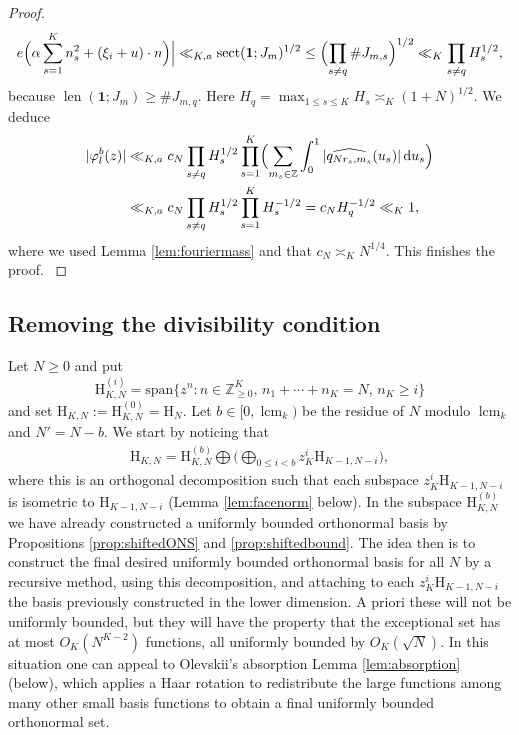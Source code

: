 \documentclass[a4paper,reqno,12pt]{amsart}
\theoremstyle{plain}
\theoremstyle{plain}
\theoremstyle{remark}
\theoremstyle{plain}
\newcommand{\PolySpace}{\mathrm{H}}
\renewcommand{\H}{\mathrm{H}}
\newcommand{\ft}{\widehat}
\newcommand{\al}{\alpha}
\newcommand{\dd}{\mathrm{d}}
\newcommand{\p}{\varphi}
\newcommand{\Z}{\mathbb{Z}}
\newcommand{\lcmk}{\operatorname{lcm}_k}
\newcommand{\len}{\operatorname{len}}
\newcommand{\sect}{\operatorname{sect}}
\theoremstyle{plain}
\theoremstyle{plain}
\begin{document}
{\begin{proof}
{\begin{align}
e\Bigl(\al\sum_{s=1}^Kn_s^2+(\xi_i+u)\cdot n\Bigr)\Bigr|
\ll_{K,a}\sect(\mathbf1;J_m)^{1/2}
\leq\Bigl(\prod_{s\ne q}\#J_{m,s}\Bigr)^{1/2}
\ll_K\prod_{s\ne q}H_s^{1/2},
\label{eq:sectionalVolumeOfTile}
\end{align}
because $\len(\mathbf1;J_m)\geq\#J_{m,q}$. Here $H_q=\max_{1\leq s\leq K} H_s \asymp_K (1+N)^{1/2}$. 
We deduce
\begin{align*}
|\p^b_{l}(z)|
&\ll_{K,a}c_N\prod_{s\ne q}H_s^{1/2}
\prod_{s=1}^K\Bigl(\sum_{m_s\in\Z}\int_0^1
|\ft{q_{Nr_s,m_s}}(u_s)|\,\dd u_s\Bigr)\\
&\ll_{K,a}c_N\prod_{s\ne q}H_s^{1/2}\prod_{s=1}^KH_s^{-1/2}
=c_NH_q^{-1/2}\ll_K1,
\end{align*}
where we used Lemma \ref{lem:fouriermass} and that $c_N \asymp_K {N^{1/4}}$.
This finishes the proof.
}
\end{proof}

\subsection{Removing the divisibility condition}\label{sec:alldegrees}
Let $N\geq 0$ and put
$$
\H_{K,N}^{(i)} = \text{span}\{z^n : n\in \Z_{\geq 0}^K, \, n_1+\cdots+n_K=N, \,  n_K\geq i\}
$$
and set $\H_{K,N}:=\H_{K,N}^{(0)}{=\PolySpace_N}$. Let $b \in [0, \lcmk)$ {be} the residue of $N$ modulo $\lcmk$ and $N'=N-b$. We start by noticing that
\begin{align}\label{eq:Hfacesdecomp}
\H_{K,N} =  \H_{K,N}^{(b)} \bigoplus \bigg(\bigoplus_{0\leq i<b} z_K^i \H_{K-1,N-i} \bigg),
\end{align}
where this is an orthogonal decomposition such that each subspace $z_K^i \H_{K-1,N-i}$ is isometric to ${\H_{K-1,N-i}}$ (Lemma \ref{lem:facenorm} below). In the subspace $\H_{K,N}^{(b)}$ we have already constructed {a} uniformly bounded orthonormal basis by Propositions \ref{prop:shiftedONS} and \ref{prop:shiftedbound}. The idea then is to construct the final desired uniformly bounded orthonormal basis for all $N$ by a recursive method, using this decomposition,  and attaching to each $z_K^i \H_{K-1,N-i}$ the basis previously constructed in the lower dimension. {A priori} these will not be uniformly bounded, but they will have the property that the exceptional set has at most ${O_K(N^{K-2})}$ functions, all uniformly bounded by $O_K(\sqrt{N})$. In this situation one can appeal to Olevskii's absorption Lemma \ref{lem:absorption} (below), which applies a Haar rotation to redistribute the large functions among many other small basis {functions} to obtain a final uniformly bounded orthonormal set.

}
\end{document}

